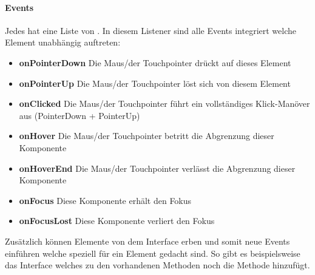 \paragraph{Events}

Jedes  hat eine Liste von . In diesem Listener sind alle Events integriert welche Element unabhängig auftreten:

\begin{itemize}
	\item{\textbf{onPointerDown}} Die Maus/der Touchpointer drückt auf dieses Element
	\item{\textbf{onPointerUp}}   Die Maus/der Touchpointer löst sich von diesem Element
	\item{\textbf{onClicked}}     Die Maus/der Touchpointer führt ein vollständiges Klick-Manöver aus (PointerDown + PointerUp)
	\item{\textbf{onHover}}       Die Maus/der Touchpointer betritt die Abgrenzung dieser Komponente
	\item{\textbf{onHoverEnd}}    Die Maus/der Touchpointer verlässt die Abgrenzung dieser Komponente
	\item{\textbf{onFocus}}       Diese Komponente erhält den Fokus
	\item{\textbf{onFocusLost}}   Diese Komponente verliert den Fokus
\end{itemize}

Zusätzlich können Elemente von dem Interface  erben und somit neue Events einführen welche speziell für ein Element gedacht sind. So gibt es beispielsweise das Interface  welches zu den vorhandenen Methoden noch die Methode  hinzufügt.


